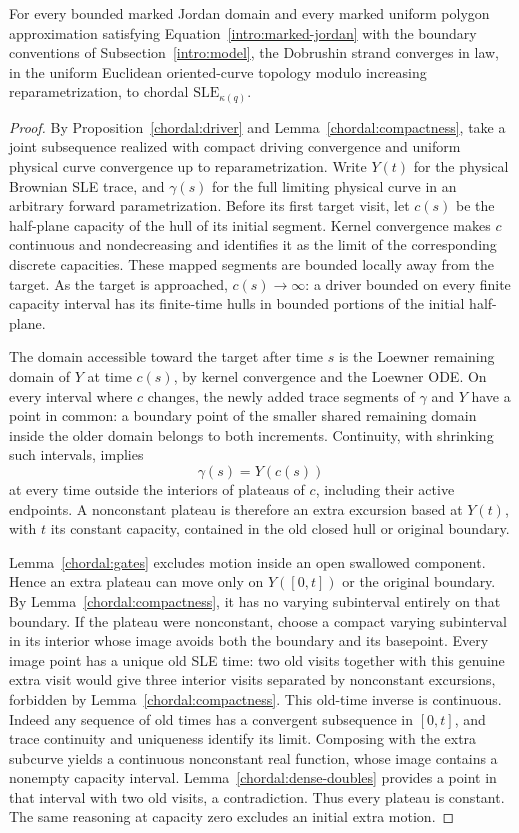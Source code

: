 \begin{theorem}
\label{chordal:trace}
For every bounded marked Jordan domain and every marked uniform
polygon approximation satisfying Equation~\eqref{intro:marked-jordan}
with the boundary conventions of Subsection~\ref{intro:model}, the Dobrushin
strand converges in law, in the uniform Euclidean oriented-curve
topology modulo increasing reparametrization, to chordal
$\mathrm{SLE}_{\kappa(q)}$.
\end{theorem}
\begin{proof}
By Proposition~\ref{chordal:driver} and
Lemma~\ref{chordal:compactness}, take a joint subsequence realized
with compact driving convergence and uniform physical curve
convergence up to reparametrization.  Write $Y(t)$ for the physical
Brownian SLE trace, and $\gamma(s)$ for the full limiting physical
curve in an arbitrary forward parametrization.  Before its first
target visit, let $c(s)$ be the half-plane capacity of the hull of
its initial segment.  Kernel convergence makes $c$ continuous and
nondecreasing and identifies it as the limit of the corresponding
discrete capacities.  These mapped segments are bounded locally
away from the target.  As the target is approached, $c(s)\to\infty$:
a driver bounded on every finite capacity interval has its finite-time
hulls in bounded portions of the initial half-plane.

The domain accessible toward the target after time $s$ is the
Loewner remaining domain of $Y$ at time $c(s)$, by kernel convergence
and the Loewner ODE.  On every interval where $c$ changes, the newly
added trace segments of $\gamma$ and $Y$ have a point in common:
a boundary point of the smaller shared remaining domain inside the
older domain belongs to both increments.  Continuity, with shrinking
such intervals, implies
\[
 \gamma(s)=Y(c(s))
\]
at every time outside the interiors of plateaus of $c$, including
their active endpoints.  A nonconstant plateau is therefore an extra
excursion based at $Y(t)$, with $t$ its constant capacity, contained
in the old closed hull or original boundary.

Lemma~\ref{chordal:gates} excludes motion inside an open swallowed
component.  Hence an extra plateau can move only on $Y([0,t])$ or
the original boundary.  By Lemma~\ref{chordal:compactness}, it has
no varying subinterval entirely on that boundary.  If the plateau
were nonconstant, choose a compact varying subinterval in its
interior whose image avoids both the boundary and its basepoint.
Every image point has a unique old SLE time: two old visits together
with this genuine extra visit would give three interior visits
separated by nonconstant excursions, forbidden by
Lemma~\ref{chordal:compactness}.  This old-time inverse is continuous.
Indeed any sequence of old times has a convergent subsequence in
$[0,t]$, and trace continuity and uniqueness identify its limit.
Composing with the extra subcurve yields a continuous nonconstant
real function, whose image contains a nonempty capacity interval.
Lemma~\ref{chordal:dense-doubles} provides a point in that interval
with two old visits, a contradiction.  Thus every plateau is
constant.  The same reasoning at capacity zero excludes an initial
extra motion.


\end{proof}
